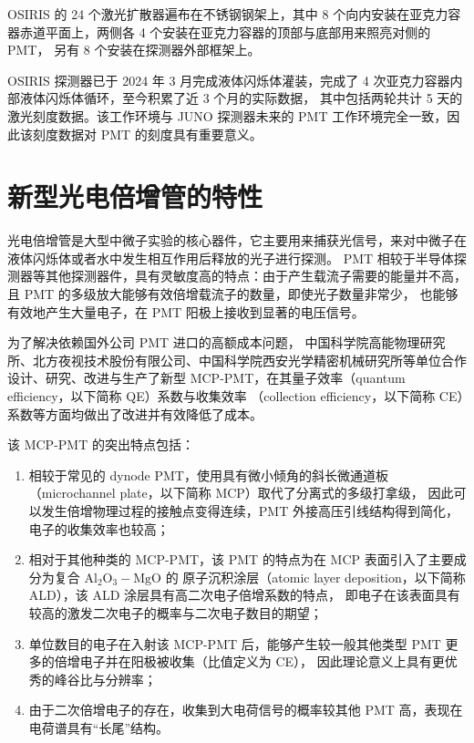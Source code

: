 OSIRIS 的 24 个激光扩散器遍布在不锈钢钢架上，其中 8 个向内安装在亚克力容器赤道平面上，两侧各 4 个安装在亚克力容器的顶部与底部用来照亮对侧的 PMT，
另有 8 个安装在探测器外部框架上。

OSIRIS 探测器已于 2024 年 3 月完成液体闪烁体灌装，完成了 4 次亚克力容器内部液体闪烁体循环，至今积累了近 3 个月的实际数据，
其中包括两轮共计 5 天的激光刻度数据。该工作环境与 JUNO 探测器未来的 PMT 工作环境完全一致，因此该刻度数据对 PMT 的刻度具有重要意义。

\section{新型光电倍增管的特性}
光电倍增管是大型中微子实验的核心器件，它主要用来捕获光信号，来对中微子在液体闪烁体或者水中发生相互作用后释放的光子进行探测。
PMT 相较于半导体探测器等其他探测器件，具有灵敏度高的特点：由于产生载流子需要的能量并不高，
且 PMT 的多级放大能够有效倍增载流子的数量，即使光子数量非常少，
也能够有效地产生大量电子，在 PMT 阳极上接收到显著的电压信号。

为了解决依赖国外公司 PMT 进口的高额成本问题，
中国科学院高能物理研究所、北方夜视技术股份有限公司、中国科学院西安光学精密机械研究所等单位合作
设计、研究、改进与生产了新型 MCP-PMT，在其量子效率（quantum efficiency，以下简称 QE）系数与收集效率
（collection efficiency，以下简称 CE）系数等方面均做出了改进\cite{wangNewDesignLarge2012}并有效降低了成本。

该 MCP-PMT 的突出特点包括：
\begin{enumerate}
    \item 相较于常见的 dynode PMT，使用具有微小倾角的斜长微通道板（microchannel plate，以下简称 MCP）取代了分离式的多级打拿级，
    因此可以发生倍增物理过程的接触点变得连续，PMT 外接高压引线结构得到简化，电子的收集效率也较高；
    \item 相对于其他种类的 MCP-PMT，该 PMT 的特点为在 MCP 表面引入了主要成分为复合 $\text{Al}_2\text{O}_3-\text{MgO}$ 的
    原子沉积涂层（atomic layer deposition，以下简称 ALD），该 ALD 涂层具有高二次电子倍增系数的特点\cite{caoSecondaryElectronEmission2021}，
    即电子在该表面具有较高的激发二次电子的概率与二次电子数目的期望；
    \item 单位数目的电子在入射该 MCP-PMT 后，能够产生较一般其他类型 PMT 更多的倍增电子并在阳极被收集（比值定义为 CE），
    因此理论意义上具有更优秀的峰谷比与分辨率；
    \item 由于二次倍增电子的存在，收集到大电荷信号的概率较其他 PMT 高，表现在电荷谱具有“长尾”结构。
\end{enumerate}

